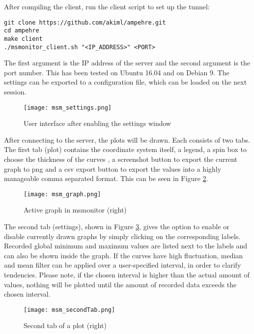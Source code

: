 After compiling the client, run the client script to set up the tunnel:
\begin{lstlisting}[caption={install the client}, label=lst:msg4]
git clone https://github.com/akiml/ampehre.git
cd ampehre
make client
./msmonitor_client.sh "<IP_ADDRESS>" <PORT>
\end{lstlisting}
The first argument is the IP address of the server and the second argument is the port number.\newline
This has been tested on Ubuntu 16.04 and on Debian 9.\newline
The settings can be exported to a configuration file, which can be loaded on the next session.
\begin{figure}[t!]
	\begin{center}
		\texttt{[image: msm\_settings.png]} 
		\caption{User interface after enabling the settings window}
		\label{fig:msm_settings}
	\end{center}
\end{figure}
After connecting to the server, the plots will be drawn.\newline 
Each consists of two tabs. The first tab (plot) contains the coordinate system itself, a legend, a spin box to choose the thickness of the curves , a screenshot button to export the current graph to png and a csv export button to export the values into a highly manageable comma separated format. This can be seen in Figure \ref{fig:msm_graph}.
\begin{figure}[t!]
	\begin{center}
		\texttt{[image: msm\_graph.png]} 
		\caption{Active graph in msmonitor (right)}
		\label{fig:msm_graph}
	\end{center}
\end{figure}
The second tab (settings), shown in Figure \ref{fig:msm_secondTab}, gives the option to enable or disable currently drawn graphs by simply clicking on the corresponding labels. Recorded global minimum and maximum values are listed next to the labels and can also be shown inside the graph.\newline
If the curves have high fluctuation, median and mean filter can be applied over a user-specified interval, in order to clarify tendencies. Please note, if the chosen interval is higher than the actual amount of values, nothing will be plotted until the amount of recorded data exceeds the chosen interval.
\begin{figure}[t!]
	\begin{center}
		\texttt{[image: msm\_secondTab.png]} 
		\caption{Second tab of a plot (right)}
		\label{fig:msm_secondTab}
	\end{center}
\end{figure}
